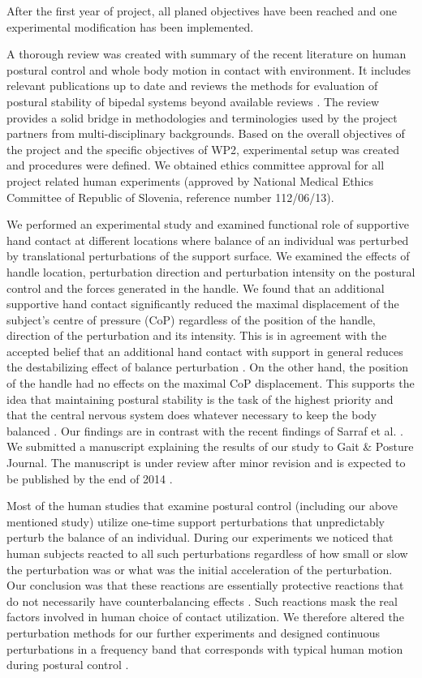 \documentclass[12pt,a4paper,twoside]{article}
\begin{document}
After the first year of project, all planed objectives have been reached and one experimental modification has been implemented.

A thorough review was created with summary of the recent literature on human postural control and whole body motion in contact with environment. It includes relevant publications up to date and reviews the methods for evaluation of postural stability of bipedal systems beyond available reviews \cite{Mergner2007, Azevedo2007}. The review provides a solid bridge in methodologies and terminologies used by the project partners from multi-disciplinary backgrounds. Based on the overall objectives of the project and the specific objectives of WP2, experimental setup was created and procedures were defined. We obtained ethics committee approval for all project related human experiments (approved by National Medical Ethics Committee of Republic of Slovenia, reference number 112/06/13).

We performed an experimental study and examined functional role of supportive hand contact at different locations where balance of an individual was perturbed by translational perturbations of the support surface. We examined the effects of handle location, perturbation direction and perturbation intensity on the postural control and the forces generated in the handle. We found that an additional supportive hand contact significantly reduced the maximal displacement of the subject's centre of pressure (CoP) regardless of the position of the handle, direction of the perturbation and its intensity. This is in agreement with the accepted belief that an additional hand contact with support in general reduces the destabilizing effect of balance perturbation \cite{Maki1997, Bateni2005, Maki2006, Wing2011}. On the other hand, the position of the handle had no effects on the maximal CoP displacement. This supports the idea that maintaining postural stability is the task of the highest priority and that the central nervous system does whatever necessary to keep the body balanced \cite{Winter1995}. Our findings are in contrast with the recent findings of Sarraf et al. \cite{Sarraf2014}. We submitted a manuscript explaining the results of our study to Gait \& Posture Journal. The manuscript is under review after minor revision and is expected to be published by the end of 2014 \cite{Babic2014}.

Most of the human studies that examine postural control \cite{Horak1986, Henry1998, Dimitrova2004} (including our above mentioned study) utilize one-time support perturbations that unpredictably perturb the balance of an individual. During our experiments we noticed that human subjects reacted to all such perturbations regardless of how small or slow the perturbation was or what was the initial acceleration of the perturbation. Our conclusion was that these reactions are essentially protective reactions that do not necessarily have counterbalancing effects \cite{McIlroy1995, Corbeil2013}. Such reactions mask the real factors involved in human choice of contact utilization. We therefore altered the perturbation methods for our further experiments and designed continuous perturbations in a frequency band that corresponds with typical human motion during postural control \cite{Nawayseh2006}.
\end{document}
